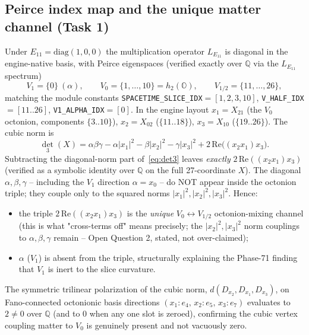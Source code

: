 \subsection{Peirce index map and the unique matter channel (Task 1)}
\label{sec:mechanism}

Under $E_{11}=\mathrm{diag}(1,0,0)$ the multiplication operator $L_{E_{11}}$ is
diagonal in the engine-native basis, with Peirce eigenspaces (verified exactly over
$\mathbb{Q}$ via the $L_{E_{11}}$ spectrum)
\begin{equation}
  V_1=\{0\}\ (\alpha),\qquad
  V_0=\{1,\dots,10\}=h_2(\mathbb{O}),\qquad
  V_{1/2}=\{11,\dots,26\},
\end{equation}
matching the module constants \texttt{SPACETIME\_SLICE\_IDX}$=[1,2,3,10]$,
\texttt{V\_HALF\_IDX}$=[11..26]$, \texttt{V1\_ALPHA\_IDX}$=[0]$. In the engine layout
$x_1=X_{21}$ (the $V_0$ octonion, components $\{3..10\}$), $x_2=X_{02}$ ($\{11..18\}$),
$x_3=X_{10}$ ($\{19..26\}$). The cubic norm is
\begin{equation}
  \det_3(X)=\alpha\beta\gamma-\alpha|x_1|^2-\beta|x_2|^2-\gamma|x_3|^2
            +2\,\mathrm{Re}\big((x_2 x_1)x_3\big).
  \label{eq:det3}
\end{equation}
Subtracting the diagonal-norm part of~\eqref{eq:det3} leaves \emph{exactly}
$2\,\mathrm{Re}((x_2x_1)x_3)$ (verified as a symbolic identity over $\mathbb{Q}$ on
the full 27-coordinate $X$). The diagonal $\alpha,\beta,\gamma$ -- including the
$V_1$ direction $\alpha=x_0$ -- do NOT appear inside the octonion triple; they couple
only to the squared norms $|x_1|^2,|x_2|^2,|x_3|^2$. Hence:
\begin{itemize}
  \item the triple $2\,\mathrm{Re}((x_2x_1)x_3)$ is the \emph{unique} $V_0\!\leftrightarrow\!V_{1/2}$
        octonion-mixing channel (this is what "cross-terms off" means precisely;
        the $|x_2|^2,|x_3|^2$ norm couplings to $\alpha,\beta,\gamma$ remain --
        Open Question 2, stated, not over-claimed);
  \item $\alpha$ ($V_1$) is absent from the triple, structurally explaining the
        Phase-71 finding that $V_1$ is inert to the slice curvature.
\end{itemize}
The symmetric trilinear polarization of the cubic norm,
$d(D_{x_2},D_{x_1},D_{x_3})$, on Fano-connected octonionic basis directions
$(x_1{:}e_4,\,x_2{:}e_5,\,x_3{:}e_7)$ evaluates to $2\neq0$ over $\mathbb{Q}$ (and to
$0$ when any one slot is zeroed), confirming the cubic vertex coupling matter to
$V_0$ is genuinely present and not vacuously zero.

